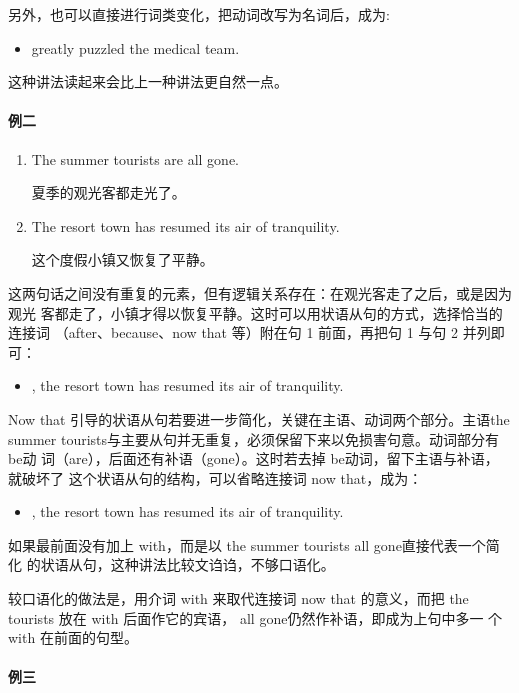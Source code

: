 另外，也可以直接进行词类变化，把动词改写为名词后，成为:
\begin{itemize}
\item {} greatly
  puzzled the medical team.
\end{itemize}

这种讲法读起来会比上一种讲法更自然一点。

\paragraph{例二}

\begin{enumerate}
\item The summer tourists are all gone.

  夏季的观光客都走光了。
\item The resort town has resumed its air of tranquility.

  这个度假小镇又恢复了平静。
\end{enumerate}

这两句话之间没有重复的元素，但有逻辑关系存在：在观光客走了之后，或是因为观光
客都走了，小镇才得以恢复平静。这时可以用状语从句的方式，选择恰当的连接词
（after、because、now that 等）附在句 1 前面，再把句 1 与句 2 并列即可：
\begin{itemize}
\item {}, the resort town has
  resumed its air of tranquility.
\end{itemize}
Now that 引导的状语从句若要进一步简化，关键在主语、动词两个部分。主语the
summer tourists与主要从句并无重复，必须保留下来以免损害句意。动词部分有 be动
词（are），后面还有补语（gone）。这时若去掉 be动词，留下主语与补语，就破坏了
这个状语从句的结构，可以省略连接词 now that，成为：
\begin{itemize}
\item {}, the resort town has resumed its air of tranquility.
\end{itemize}
如果最前面没有加上 with，而是以 the summer tourists all gone直接代表一个简化
的状语从句，这种讲法比较文诌诌，不够口语化。

较口语化的做法是，用介词 with 来取代连接词 now that 的意义，而把 the
tourists 放在 with 后面作它的宾语， all gone仍然作补语，即成为上句中多一
个 with 在前面的句型。

\paragraph{例三}

